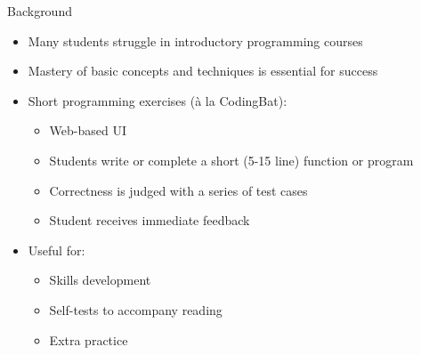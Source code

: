 \documentclass{beamer}
\begin{document}
\begin{frame}{Background}

\begin{itemize}
  \item Many students struggle in introductory programming courses
  \item Mastery of basic concepts and techniques is essential for success
  \item Short programming exercises ({\` a} la CodingBat):
  \begin{itemize}
    \item Web-based UI
    \item Students write or complete a short (5-15 line) function or program
    \item Correctness is judged with a series of test cases
    \item Student receives immediate feedback
  \end{itemize}
  \item Useful for:
  \begin{itemize}
    \item Skills development
    \item Self-tests to accompany reading
    \item Extra practice
  \end{itemize}
\end{itemize}

\end{frame}
\end{document}
